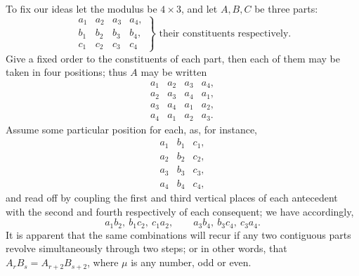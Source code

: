 \documentclass[11pt]{article}
\begin{document}
{{To fix our ideas let the modulus be $4\times3$, and let $A,B,C$ be three parts:
\[
\left.\begin{array}{llll}
a_1&a_2&a_3&a_4,\\
b_1&b_2&b_3&b_4,\\
c_1&c_2&c_3&c_4
\end{array}\right\}\text{ their constituents respectively.}
\]
Give a fixed order to the constituents of each part, then each of them may be taken in four positions; thus $A$ may be written
\[
\begin{array}{llll}
a_1&a_2&a_3&a_4,\\
a_2&a_3&a_4&a_1,\\
a_3&a_4&a_1&a_2,\\
a_4&a_1&a_2&a_3.
\end{array}
\]
Assume some particular position for each, as, for instance,
\[
\begin{array}{lll}
a_1&b_1&c_1,\\
a_2&b_2&c_2,\\
a_3&b_3&c_3,\\
a_4&b_4&c_4,
\end{array}
\]
and read off by coupling the first and third vertical places of each antecedent with the second and fourth respectively of each consequent; we have accordingly,
\[
a_1b_2,\ b_1c_2,\ c_1a_2,
\qquad
 a_3b_4,\ b_3c_4,\ c_3a_4.
\]
It is apparent that the same combinations will recur if any two contiguous parts revolve simultaneously through two steps; or in other words, that $A_rB_s=A_{r+2}B_{s+2}$, where $\mu$ is any number, odd or even.

}}
\end{document}
